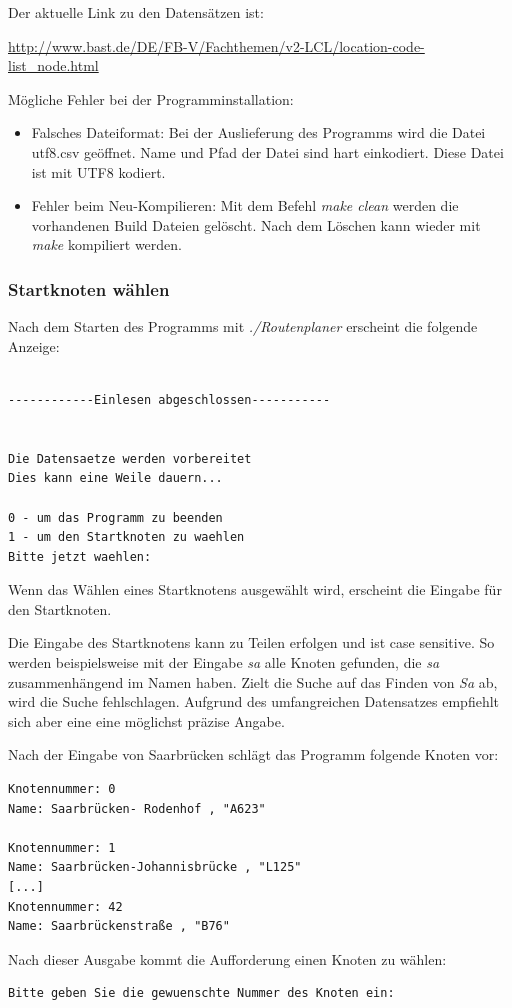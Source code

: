 \documentclass[12pt, a4paper, ngerman]{article}
\begin{document}
Der aktuelle Link zu den Datensätzen ist:  

\href{http://www.bast.de/DE/FB-V/Fachthemen/v2-LCL/location-code-list\_node.html}{http://www.bast.de/DE/FB-V/Fachthemen/v2-LCL/location-code-list\_node.html}

\smallskip
Mögliche Fehler bei der Programminstallation:
\begin{itemize}
	\item Falsches Dateiformat: Bei der Auslieferung des Programms wird die Datei utf8.csv geöffnet. Name und Pfad der Datei sind hart einkodiert. Diese Datei ist mit UTF8 kodiert. 	\item Fehler beim Neu-Kompilieren: Mit dem Befehl \textit{make clean}  werden die vorhandenen Build Dateien gelöscht. Nach dem Löschen kann wieder mit \textit{make} kompiliert werden.
\end{itemize}

\subsubsection{Startknoten wählen}
Nach dem Starten des Programms mit \textit{./Routenplaner} erscheint die folgende Anzeige:

\begin{lstlisting}

------------Einlesen abgeschlossen-----------


Die Datensaetze werden vorbereitet
Dies kann eine Weile dauern...

0 - um das Programm zu beenden
1 - um den Startknoten zu waehlen
Bitte jetzt waehlen:  
\end{lstlisting}

Wenn das Wählen eines Startknotens ausgewählt wird, erscheint die Eingabe für den Startknoten.

Die Eingabe des Startknotens kann zu Teilen erfolgen und ist case sensitive. So werden beispielsweise mit der Eingabe \textit{sa} alle Knoten gefunden, die \textit{sa} zusammenhängend im Namen haben. Zielt die Suche auf das Finden von \textit{Sa} ab, wird die Suche fehlschlagen. Aufgrund des umfangreichen Datensatzes empfiehlt sich aber eine eine möglichst präzise Angabe. 

Nach der Eingabe von Saarbrücken schlägt das Programm folgende Knoten vor:
\begin{lstlisting}
Knotennummer: 0
Name: Saarbrücken- Rodenhof , "A623"

Knotennummer: 1
Name: Saarbrücken-Johannisbrücke , "L125"
[...]
Knotennummer: 42
Name: Saarbrückenstraße , "B76"
\end{lstlisting} 
Nach dieser Ausgabe kommt die Aufforderung einen Knoten zu wählen:
\begin{lstlisting}
Bitte geben Sie die gewuenschte Nummer des Knoten ein:
\end{lstlisting}
\end{document}
